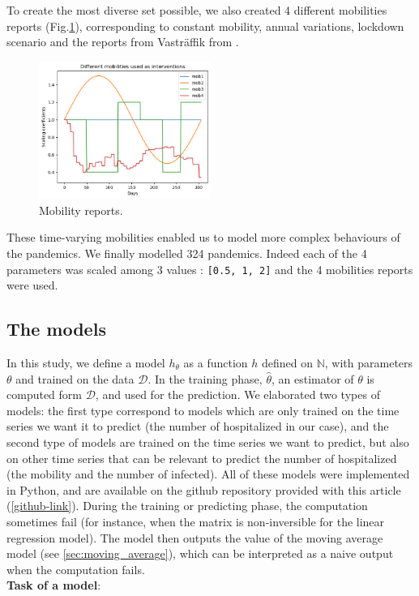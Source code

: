 To create the most diverse set possible, we also created 4 different mobilities reports (Fig.\ref{fig:mobilities}), corresponding to constant mobility, annual variations, lockdown scenario and the reports from Vasträffik from \cite{gerlee2021predicting}. 
\begin{figure}
    \centering
    \includegraphics[width=0.5\textwidth]{figures/mobilities.png}
    \caption{Mobility reports.}
    \label{fig:mobilities}
\end{figure}
These time-varying mobilities enabled us to model more complex behaviours of the pandemics. 
We finally modelled 324 pandemics. 
Indeed each of the 4 parameters was scaled among 3 values : \texttt{[0.5, 1, 2]} and the 4 mobilities reports were used.


\subsection{The models}

In this study, we define a model ${h}_{\theta }$ as a function ${h}$  defined on $ \mathbb{N}$, with parameters $\theta$ and trained on the data $\mathcal{D}$.
In the training phase, $\hat{\theta}$,  an estimator of $\theta$ is computed form $\mathcal{D}$, and used for the prediction.  
We elaborated two types of models: the first type correspond to models which are only trained on the time series we want it to predict (the number of hospitalized in our case), and the second type of models are trained on the time series we want to predict, but also on other time series that can be relevant to predict the number of hospitalized (the mobility and the number of infected). 
All of these models were implemented in Python, and are available on the github repository provided with this article (\ref{github-link}).
During the training or predicting phase, the computation sometimes fail (for instance, when the matrix is non-inversible for the linear regression model). 
The model then outputs the value of the moving average model (see \ref{sec:moving_average}), which can be interpreted as a naive output when the computation fails. \\[0.3cm]
\textbf{Task of a model}: \\

